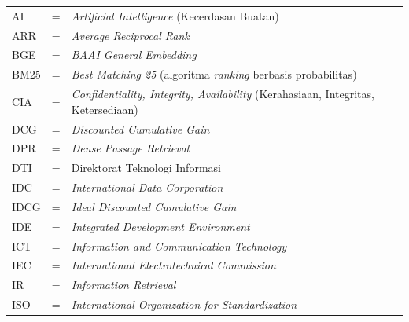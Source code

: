 \small
\setlength{\itemsep}{0pt}
\begin{tabular}{llp{9.8cm}}
	AI        & \hspace{0.8cm} = & \textit{Artificial Intelligence} (Kecerdasan Buatan) \\[1pt]
	ARR       & \hspace{0.8cm} = & \textit{Average Reciprocal Rank} \\[1pt]
	BGE       & \hspace{0.8cm} = & \textit{BAAI General Embedding} \\[1pt]
	BM25      & \hspace{0.8cm} = & \textit{Best Matching 25} (algoritma \textit{ranking} berbasis probabilitas) \\[1pt]
	CIA       & \hspace{0.8cm} = & \textit{Confidentiality, Integrity, Availability} (Kerahasiaan, Integritas, Ketersediaan) \\[1pt]
	DCG       & \hspace{0.8cm} = & \textit{Discounted Cumulative Gain} \\[1pt]
	DPR       & \hspace{0.8cm} = & \textit{Dense Passage Retrieval} \\[1pt]
	DTI       & \hspace{0.8cm} = & Direktorat Teknologi Informasi \\[1pt]
	IDC       & \hspace{0.8cm} = & \textit{International Data Corporation} \\[1pt]
	IDCG      & \hspace{0.8cm} = & \textit{Ideal Discounted Cumulative Gain} \\[1pt]
	IDE       & \hspace{0.8cm} = & \textit{Integrated Development Environment} \\[1pt]
	ICT       & \hspace{0.8cm} = & \textit{Information and Communication Technology} \\[1pt]
	IEC       & \hspace{0.8cm} = & \textit{International Electrotechnical Commission} \\[1pt]
	IR        & \hspace{0.8cm} = & \textit{Information Retrieval} \\[1pt]
	ISO       & \hspace{0.8cm} = & \textit{International Organization for Standardization} \\[1pt]

\end{tabular}
